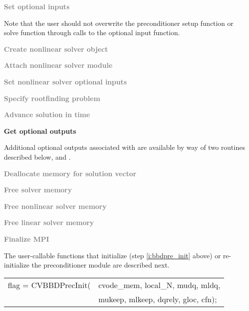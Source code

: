 \begin{Steps}
\item
  \textcolor{gray}{\bf Set optional inputs}

  Note that the user should not overwrite the preconditioner setup function
  or solve function through calls to the 
  optional input function.

\item
  \textcolor{gray}{\bf Create nonlinear solver object}

\item
  \textcolor{gray}{\bf Attach nonlinear solver module}

\item
  \textcolor{gray}{\bf Set nonlinear solver optional inputs}

\item
  \textcolor{gray}{\bf Specify rootfinding problem}

\item
  \textcolor{gray}{\bf Advance solution in time}

\item
  {\bf Get optional outputs}

  Additional optional outputs associated with {\cvbbdpre} are available by
  way of two routines described below,
   and .

\item
  \textcolor{gray}{\bf Deallocate memory for solution vector}

\item
  \textcolor{gray}{\bf Free solver memory}

\item
  \textcolor{gray}{\bf Free nonlinear solver memory}

\item
  \textcolor{gray}{\bf Free linear solver memory}

\item
  \textcolor{gray}{\bf Finalize MPI}

\end{Steps}
The user-callable functions that initialize (step \ref{i:bbdpre_init} above) or re-initialize
the {\cvbbdpre} preconditioner module are described next.
{
   \begin{tabular}[t]{@{}r@{}l@{}}
     flag = CVBBDPrecInit(&cvode\_mem, local\_N, mudq, mldq, \\
                          &mukeep, mlkeep, dqrely, gloc, cfn);
   \end{tabular}
}
